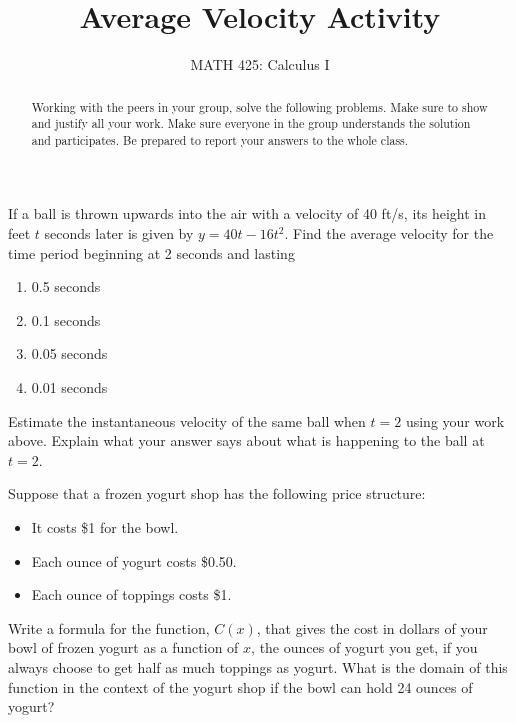 \documentclass{ximera}
\title{Average Velocity Activity}
\author{MATH 425: Calculus I}
\begin{document}
\begin{abstract}
    Working with the peers in your group, solve the following problems. Make sure to show and justify all your work. Make sure everyone in the group understands the solution and participates. Be prepared to report your answers to the whole class. 
\end{abstract}
\maketitle


\begin{exercise}
 If a ball is thrown upwards into the air with a velocity of 40 ft/s, its height in feet $t$ seconds later is given by $y=40t-16t^2$.  
  Find the average velocity for the time period beginning at 2 seconds and lasting 
     \begin{enumerate}
         \item 0.5 seconds
         \item 0.1 seconds
         \item 0.05 seconds
         \item 0.01 seconds
     \end{enumerate}
 Estimate the instantaneous velocity of the same ball when $t=2$ using your work above.  Explain what your answer says about what is happening to the ball at $t=2$. 

\end{exercise}

\begin{exercise}
Suppose that a frozen yogurt shop has the following price structure: 
 \begin{itemize}
     \item It costs \$1 for the bowl.
     \item Each ounce of yogurt costs \$0.50.
     \item Each ounce of toppings costs \$1.
 \end{itemize}
 Write a formula for the function, $C(x)$, that gives the cost in dollars of your bowl of frozen yogurt as a function of $x$, the ounces of yogurt you get, if you always choose to get half as much toppings as yogurt. What is the domain of this function in the context of the yogurt shop if the bowl can hold 24 ounces of yogurt?
\end{exercise}
\end{document}
